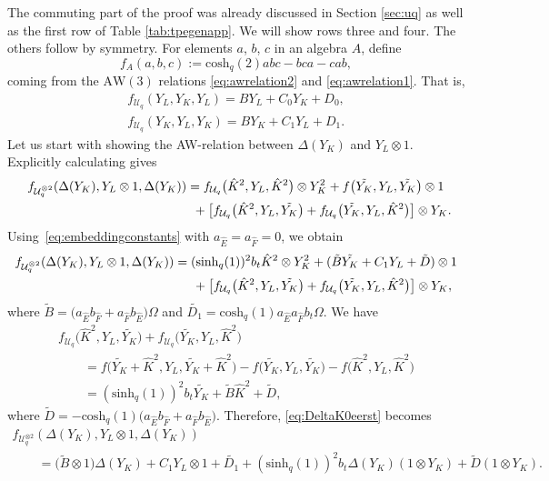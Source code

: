 \documentclass[10pt,a4paper]{amsart}
\numberwithin{equation}{section}
\newcommand{\aw}{\mathrm{AW}\!\left(3\right)}
\newcommand{\chq}{\mathrm{cosh}_q}
\newcommand{\shq}{\mathrm{sinh}_q}
\newcommand{\tensor}[1]{^{\otimes{#1}}}
\newcommand{\Uq}{\mathcal{U}_q}
\begin{document}
The commuting part of the proof was already discussed in Section \ref{sec:uq} as well as the first row of Table \ref{tab:tpegenapp}. We will show rows three and four. The others follow by symmetry. For elements $a$, $b$, $c$ in an algebra $A$, define
\[
f_A(a,b,c):=\chq(2)abc-bca-cab,
\]
coming from the $\aw$ relations \eqref{eq:awrelation2} and \eqref{eq:awrelation1}. That is,
\begin{gather*}
	f_{\Uq}(Y_L,Y_K,Y_L)=BY_L + C_0Y_K + D_0,\\
	f_{\Uq}(Y_K,Y_L,Y_K)=BY_K + C_1 Y_L + D_1.
\end{gather*}
Let us start with showing the AW-relation between $\Delta(Y_K)$ and $Y_L\otimes 1$. Explicitly calculating gives
\begin{gather*}
	f_{\Uq\tensor{2}}(\Delta(Y_K),Y_L\otimes 1,\Delta(Y_K)) =f_{\Uq}\big(\hat{K}^2,Y_L,\hat{K}^2\big)\otimes Y_K^2 +f\big(\tilde{Y_K},Y_L,\tilde{Y_K}\big)\otimes 1 \\
\hphantom{f_{\Uq\tensor{2}}(\Delta(Y_K),Y_L\otimes 1,\Delta(Y_K)) =}{}
 + \big[f_{\Uq}\big(\hat{K}^2,Y_L,\tilde{Y_K}\big)+f_{\Uq}\big(\tilde{Y_K},Y_L,\hat{K}^2\big)\big]\otimes Y_K.
\end{gather*}
Using~\eqref{eq:embeddingconstants} with $a_{\hat{E}}=a_{\hat{F}}=0$, we obtain
\begin{gather}
	f_{\Uq\tensor{2}}(\Delta(Y_K),Y_L\otimes 1,\Delta(Y_K)) =(\shq(1))^2b_t \hat{K}^2\otimes Y_K^2 +(\tilde{B}\tilde{Y_K}+C_1 Y_L +\tilde{D})\otimes 1 \nonumber \\
\hphantom{f_{\Uq\tensor{2}}(\Delta(Y_K),Y_L\otimes 1,\Delta(Y_K)) =}{}
 + \big[f_{\Uq}\big(\hat{K}^2,Y_L,\tilde{Y_K}\big)+f_{\Uq}\big(\tilde{Y_K},Y_L,\hat{K}^2\big)\big]\otimes Y_K,\label{eq:DeltaK0eerst}
\end{gather}
where $\tilde{B}=\big(a_{\hat{E}}b_{\hat{F}}+a_{\hat{F}}b_{\hat{E}}\big)\Omega$ and $\tilde{D_1}= \chq(1)a_{\hat{E}}a_{\hat{F}}b_t\Omega$.
We have
\begin{gather*}
	f_{\Uq}\big(\hat{K}^2,Y_L,\tilde{Y_K}\big)+f_{\Uq}\big(\tilde{Y_K},Y_L,\hat{K}^2\big)\\
\qquad{} = f\big(\tilde{Y_K}+\hat{K}^2,Y_L,\tilde{Y_K}+\hat{K}^2\big) -f\big(\tilde{Y_K},Y_L,\tilde{Y_K}\big)-f\big(\hat{K}^2,Y_L,\hat{K}^2\big)\\
	\qquad{}= (\shq(1))^2 b_t \tilde{Y_K}+\tilde{B} \hat{K}^2 +\tilde{D},
\end{gather*}
where $\tilde{D}=-\chq(1)\big(a_{\hat{E}}b_{\hat{F}}+a_{\hat{F}}b_{\hat{E}}\big)$.
Therefore, \eqref{eq:DeltaK0eerst} becomes
\begin{gather*}
f_{\Uq\tensor{2}}(\Delta(Y_K),Y_L\otimes 1,\Delta(Y_K))\\
\qquad{} =\big(\tilde{B}\otimes 1\big)\Delta(Y_K) + C_1 Y_L\otimes 1 + \tilde{D_1}
 + (\shq(1))^2b_t \Delta(Y_K)(1\otimes Y_K) +\tilde{D}(1\otimes Y_K). %
\end{gather*}
\end{document}
